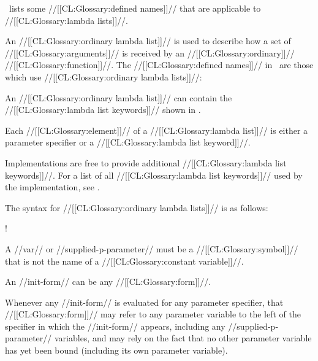 \Thenextfigure\ lists some //[[CL:Glossary:defined names]]// that are applicable
to //[[CL:Glossary:lambda lists]]//.




An //[[CL:Glossary:ordinary lambda list]]// is used to describe how a set of
//[[CL:Glossary:arguments]]// is received by an //[[CL:Glossary:ordinary]]// //[[CL:Glossary:function]]//.  
The //[[CL:Glossary:defined names]]// in \thenextfigure\ are those which use
//[[CL:Glossary:ordinary lambda lists]]//:




An //[[CL:Glossary:ordinary lambda list]]// can contain the //[[CL:Glossary:lambda list keywords]]// shown
in \thenextfigure.


Each //[[CL:Glossary:element]]// of a //[[CL:Glossary:lambda list]]// is either a parameter specifier
or a //[[CL:Glossary:lambda list keyword]]//.

Implementations are free to provide additional //[[CL:Glossary:lambda list keywords]]//.
For a list of all //[[CL:Glossary:lambda list keywords]]//
used by the implementation, see .

The syntax for //[[CL:Glossary:ordinary lambda lists]]// is as follows: 

\Vskip 1pc!


A //var// or //supplied-p-parameter// must be a //[[CL:Glossary:symbol]]//
that is not the name of a //[[CL:Glossary:constant variable]]//.

An //init-form// can be any //[[CL:Glossary:form]]//.

Whenever any //init-form// is evaluated for any parameter
specifier, that //[[CL:Glossary:form]]// may refer to any parameter variable to
the left of the specifier in which the //init-form// appears,
including any //supplied-p-parameter// variables, and may rely 
on the fact that no other parameter variable has yet been bound
(including its own parameter variable).

